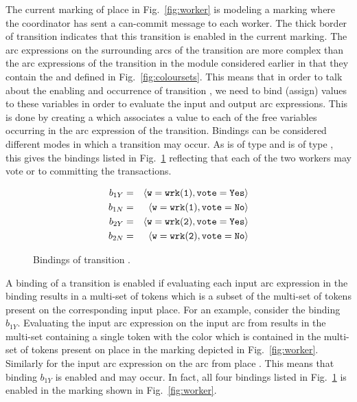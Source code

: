 The current marking of place  in
Fig.~\ref{fig:worker} is  modeling a
marking where the coordinator has sent a can-commit message to each
worker. The thick border of transition 
indicates that this transition is enabled in the current marking. The
arc expressions on the surrounding arcs of the
 transition are more complex than the arc
expressions of the  transition in the
 module considered earlier in that they contain
the   and  defined in
Fig.~\ref{fig:coloursets}. This means that in order to talk about the
enabling and occurrence of transition , we
need to bind (assign) values to these variables in order to evaluate
the input and output arc expressions. This is done by creating a
 which associates a value to each of the free
variables occurring in the arc expression of the transition. Bindings
can be considered different modes in which a transition may occur.  As
 is of type  and  is of type
, this gives the bindings listed in
Fig.~\ref{fig:bindings} reflecting that each of the two workers may
vote  or  to committing the transactions.

\begin{figure}[]
\centering
\begin{eqnarray*}
b_{1Y} & = & \langle {\tt{w}} = {\tt{wrk(1)}}, {\tt{vote}} = {\tt{Yes}} \rangle \\
b_{1N} & = & \langle {\tt{w}} = {\tt{wrk(1)}}, {\tt{vote}} = {\tt{No}} \rangle \\
b_{2Y} & = & \langle {\tt{w}} = {\tt{wrk(2)}}, {\tt{vote}} = {\tt{Yes}} \rangle \\
b_{2N} & = & \langle {\tt{w}} = {\tt{wrk(2)}}, {\tt{vote}} = {\tt{No}} \rangle
\end{eqnarray*}
\caption{Bindings of transition .}
\label{fig:bindings}
\end{figure}

A binding of a transition is enabled if evaluating each input arc
expression in the binding results in a multi-set of tokens which is a
subset of the multi-set of tokens present on the corresponding input
place. For an example, consider the binding $b_{1Y}$. Evaluating the
input arc expression  on the input arc from 
results in the multi-set containing a single token with the color
 which is contained in the multi-set of tokens present
on place  in the marking depicted in
Fig.~\ref{fig:worker}. Similarly for the input arc expression on the
arc from place . This means that binding $b_{1Y}$
is enabled and may occur. In fact, all four bindings listed in
Fig.~\ref{fig:bindings} is enabled in the marking shown in
Fig.~\ref{fig:worker}.


